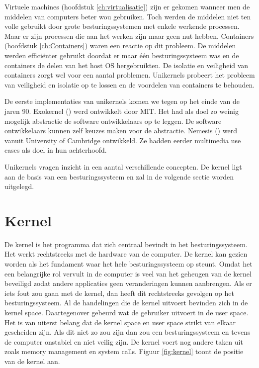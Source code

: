 \documentclass[pdftex,a4paper,12pt,twoside]{report}
\begin{document}
Virtuele machines (hoofdstuk \ref{ch:virtualisatie}) zijn er gekomen wanneer men de middelen van computers beter wou gebruiken. Toch werden de middelen niet ten volle gebruikt door grote besturingssystemen met enkele werkende processen. Maar er zijn processen die aan het werken zijn maar geen nut hebben. Containers (hoofdstuk \ref{ch:Containers}) waren een reactie op dit probleem. De middelen werden efficiënter gebruikt doordat er maar één besturingssysteem was en de containers de delen van het host OS hergebruikten. De isolatie en veiligheid van containers zorgt wel voor een aantal problemen. Unikernels probeert het probleem van veiligheid en isolatie op te lossen en de voordelen van containers te behouden.

De eerste implementaties van unikernels komen we tegen op het einde van de jaren 90. Exokernel (\cite{mit_mit_1998}) werd ontwikkelt door MIT. Het had als doel zo weinig mogelijk abstractie de software ontwikkelaars op te leggen. De software ontwikkelaars kunnen zelf keuzes maken voor de abstractie. Nemesis (\cite{university_of_cambridge_nemesis_2000}) werd vanuit University of Cambridge ontwikkeld. Ze hadden eerder multimedia use cases als doel in hun achterhoofd.

Unikernels vragen inzicht in een aantal verschillende concepten. De kernel ligt aan de basis van een besturingssysteem en zal in de volgende sectie worden uitgelegd.

\section{Kernel}

De kernel is het programma dat zich centraal bevindt in het besturingssysteem. Het werkt rechtstreeks met de hardware van de computer. De kernel kan gezien worden als het fundament waar het hele besturingssysteem op steunt. Omdat het een belangrijke rol vervult in de computer is veel van het geheugen van de kernel beveiligd zodat andere applicaties geen veranderingen kunnen aanbrengen. Als er iets fout zou gaan met de kernel, dan heeft dit rechtstreeks gevolgen op het besturingssysteem. Al de handelingen die de kernel uitvoert bevinden zich in de kernel space. Daartegenover gebeurd wat de gebruiker uitvoert in de user space. Het is van uiterst belang dat de kernel space en user space strikt van elkaar gescheiden zijn. Als dit niet zo zou zijn dan zou een besturingssysteem en tevens de computer onstabiel en niet veilig zijn. De kernel voert nog andere taken uit zoals memory management en system calls. Figuur \ref{fig:kernel} toont de positie van de kernel aan.
\end{document}
